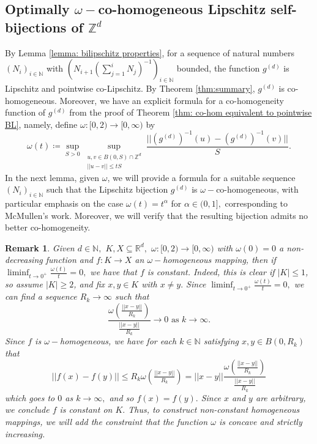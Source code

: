 \documentclass{article}
\newtheorem{remark}[define]{Remark}
\newcommand{\R}{\mathbb{R}}
\newcommand{\Z}{\mathbb{Z}}
\newcommand{\N}{\mathbb{N}}
\begin{document}
\subsection{Optimally $\omega-$co-homogeneous Lipschitz self-bijections of $\Z^d$}
By Lemma \ref{lemma: bilipschitz properties}, for a  sequence of natural numbers $(N_i)_{i \in \N}$ with $(N_{i+1}(\sum_{j=1}^{i}N_j)^{-1})_{i \in \N}$ bounded, the function $g^{(d)}$ is Lipschitz and pointwise co-Lipschitz. By Theorem \ref{thm:summary}, $g^{(d)}$ is co-homogeneous. Moreover, we have an explicit formula for a co-homogeneity function of $g^{(d)}$ from the proof of Theorem \ref{thm: co-hom equivalent to pointwise BL}, namely, define $\omega:[0,2) \to [0,\infty)$ by
$$\omega(t) \coloneqq \sup_{S>0} \sup_{\substack{u,v \in B(0,S) \cap \Z^d\\||u-v|| \leq tS}} \frac{||(g^{(d)})^{-1}(u)-(g^{(d)})^{-1}(v)||}{S}.$$
 In the next lemma, given $\omega$, we will provide a formula for a suitable sequence $(N_i)_{i \in \N}$ such that the Lipschitz bijection $g^{(d)}$ is $\omega-$co-homogeneous, with particular emphasis on the case $\omega(t) = t^{\alpha}$ for $\alpha \in (0,1],$ corresponding to McMullen's work. Moreover, we will verify that the resulting bijection admits no better co-homogeneity.

\begin{remark}
   Given $d \in \N,$ $K,X \subseteq \R^d,$ $\omega:[0,2) \to [0,\infty)$ with $\omega(0) = 0$ a non-decreasing function and $f:K \to X$ an $\omega-$homogeneous mapping, then if $\liminf_{t \to 0^+}\frac{\omega(t)}{t} =0,$ we have that $f$ is constant. Indeed, this is clear if $|K|\leq 1$, so assume $|K| \geq 2$, and fix $x, y \in K$ with $x \neq y.$ Since $\liminf_{t \to 0^+}\frac{\omega(t)}{t} =0,$ we can find a sequence $R_k \to \infty$ such that $$\frac{\omega\left(\frac{||x-y||}{R_k}\right)}{\frac{||x-y||}{R_k}} \to 0 \text{ as } k \to \infty.$$ Since $f$ is $\omega-$homogeneous, we have for each $k \in \N$ satisfying $x,y \in B(0,R_k)$ that
    $$||f(x)-f(y)|| \leq R_k\omega\left(\tfrac{||x-y||}{R_k}\right) = ||x-y|| \frac{\omega\left(\frac{||x-y||}{R_k}\right)}{\frac{||x-y||}{R_k}}$$ which goes to $0$ as $k \to \infty,$ and so $f(x) = f(y).$ Since $x$ and $y$ are arbitrary, we conclude $f$ is constant on $K.$ Thus, to construct non-constant homogeneous mappings, we will add the constraint that the function $\omega$ is concave and strictly increasing.
\end{remark}
\end{document}
